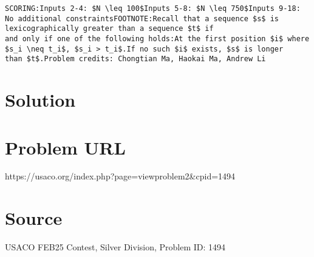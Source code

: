 \documentclass[12pt]{article}
\begin{document}
\begin{verbatim}
SCORING:Inputs 2-4: $N \leq 100$Inputs 5-8: $N \leq 750$Inputs 9-18: No additional constraintsFOOTNOTE:Recall that a sequence $s$ is lexicographically greater than a sequence $t$ if
and only if one of the following holds:At the first position $i$ where
$s_i \neq t_i$, $s_i > t_i$.If no such $i$ exists, $s$ is longer
than $t$.Problem credits: Chongtian Ma, Haokai Ma, Andrew Li
\end{verbatim}

\section*{Solution}


\section*{Problem URL}
https://usaco.org/index.php?page=viewproblem2&cpid=1494

\section*{Source}
USACO FEB25 Contest, Silver Division, Problem ID: 1494
\end{document}
